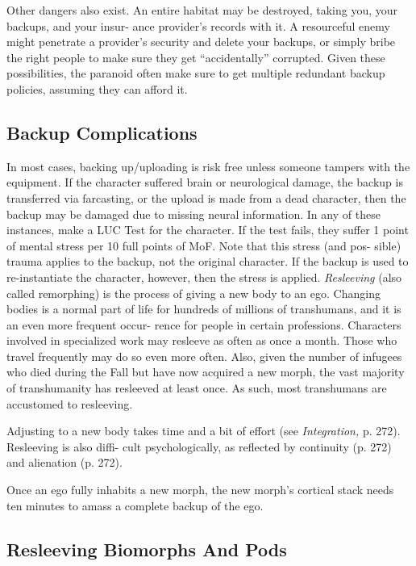 Other dangers also exist. An entire habitat may be 
destroyed, taking you, your backups, and your insur-
ance provider's records with it. A resourceful enemy 
might penetrate a provider's security and delete your 
backups, or simply bribe the right people to make 
sure they get ``accidentally'' corrupted. Given these 
possibilities, the paranoid often make sure to get 
multiple redundant backup policies, assuming they 
can afford it.

\subsection{Backup Complications}

In most cases, backing up/uploading is risk free unless 
someone tampers with the equipment. If the character 
suffered brain or neurological damage, the backup is 
transferred via farcasting, or the upload is made from 
a dead character, then the backup may be damaged 
due to missing neural information. In any of these 
instances, make a LUC Test for the character. If the 
test fails, they suffer 1 point of mental stress per 10 
full points of MoF. Note that this stress (and pos-
sible) trauma applies to the backup, not the original 
character. If the backup is used to re-instantiate the 
character, however, then the stress is applied.
\textit{Resleeving} (also called remorphing) is the process 
of giving a new body to an ego. Changing bodies 
is a normal part of life for hundreds of millions of 
transhumans, and it is an even more frequent occur-
rence for people in certain professions. Characters 
involved in specialized work may resleeve as often as 
once a month. Those who travel frequently may do so 
even more often. Also, given the number of infugees 
who died during the Fall but have now acquired a 
new morph, the vast majority of transhumanity has 
resleeved at least once. As such, most transhumans are 
accustomed to resleeving.

Adjusting to a new body takes time and a bit of 
effort (see \textit{Integration,} p. 272). Resleeving is also diffi-
cult psychologically, as reflected by continuity (p. 272) 
and alienation (p. 272).

Once an ego fully inhabits a new morph, the new 
morph's cortical stack needs ten minutes to amass a 
complete backup of the ego.

\subsection{Resleeving Biomorphs And Pods}

